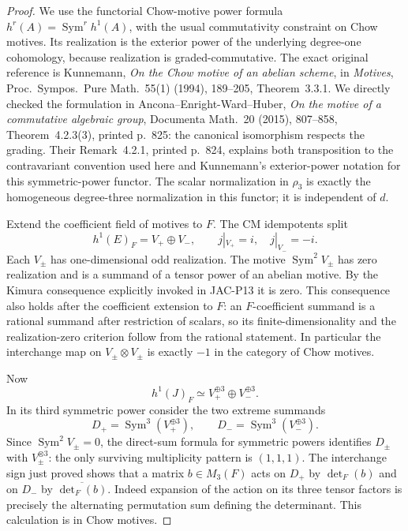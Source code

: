 \documentclass[11pt,a4paper]{article}
\begin{document}
\begin{proof}
We use the functorial Chow-motive power formula
$h^r(A)=\operatorname{Sym}^r h^1(A)$, with the usual commutativity
constraint on Chow motives. Its realization is the exterior power
of the underlying degree-one cohomology, because realization is
graded-commutative. The exact original reference is Kunnemann,
\emph{On the Chow motive of an abelian scheme}, in \emph{Motives},
Proc.\ Sympos.\ Pure Math.\ 55(1) (1994), 189--205,
Theorem~3.3.1. We directly checked the formulation in
Ancona--Enright-Ward--Huber, \emph{On the motive of a commutative
algebraic group}, Documenta Math.\ 20 (2015), 807--858,
Theorem~4.2.3(3), printed p.~825: the canonical isomorphism respects
the grading. Their Remark~4.2.1, printed p.~824, explains both
transposition to the contravariant convention used here and
Kunnemann's exterior-power notation for this symmetric-power functor.
The scalar normalization in $\rho_3$ is exactly the homogeneous
degree-three normalization in this functor; it is independent of $d$.

Extend the coefficient field of motives to $F$. The CM idempotents
split
\[
 h^1(E)_F=V_+\oplus V_-,
 \qquad j|_{V_+}=i,\quad j|_{V_-}=-i.
\]
Each $V_\pm$ has one-dimensional odd realization.
The motive $\operatorname{Sym}^2 V_\pm$ has zero realization and
is a summand of a tensor power of an abelian motive. By the
Kimura consequence explicitly invoked in JAC-P13 it is zero.
This consequence also holds after the coefficient extension to $F$:
an $F$-coefficient summand is a rational summand after restriction
of scalars, so its finite-dimensionality and the realization-zero
criterion follow from the rational statement.
In particular the interchange map on $V_\pm\otimes V_\pm$ is
exactly $-1$ in the category of Chow motives.

Now
\[
 h^1(J)_F\simeq V_+^{\oplus3}\oplus V_-^{\oplus3}.
\]
In its third symmetric power consider the two extreme summands
\[
 D_+=\operatorname{Sym}^3(V_+^{\oplus3}),\qquad
 D_-=\operatorname{Sym}^3(V_-^{\oplus3}).               \tag{JAC.P14.4}
\]
Since $\operatorname{Sym}^2V_\pm=0$, the direct-sum formula for
symmetric powers identifies $D_\pm$ with $V_\pm^{\otimes3}$:
the only surviving multiplicity pattern is $(1,1,1)$.
The interchange sign just proved shows that a matrix
$b\in M_3(F)$ acts on $D_+$ by $\det_F(b)$ and on $D_-$ by
$\overline{\det_F(b)}$. Indeed expansion of the action on its
three tensor factors is precisely the alternating permutation sum
defining the determinant. This calculation is in Chow motives.


\end{proof}
\end{document}
